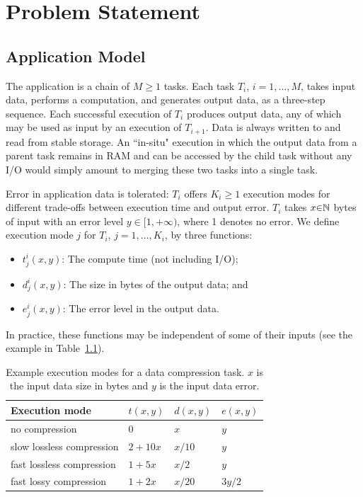 \chapter{Problem Statement}
\label{sec:problem}

\section{Application Model}
\label{sec:problem-application}

The application is a chain of $M{\geq}1$
tasks. Each task $T_i$, $i{=}1, \ldots, M$, takes input data,
performs a computation, and generates output data, as a three-step
sequence. Each successful execution of $T_i$ produces output data,
any of which may be used as input by an execution of $T_{i+1}$. 
Data is always written to and read from stable
storage.  An ``in-situ" execution in which the output data from a parent
task remains in RAM and can be accessed by the child task without
any I/O would simply amount to merging these two
tasks into a single task.


Error in application data is tolerated:  $T_i$ offers $K_i{\geq}1$
execution modes for different trade-offs between
execution time and output error. 
$T_i$ takes $x{\in}\mathbb{N}$ bytes of input with an error level $y{\in}[1,
+\infty)$, where 1 denotes no error.  We define execution mode $j$ for
$T_i$, $j{=}1,\ldots, K_i$, by three functions:
\begin{itemize}
\item $t^i_j(x,y)$: The compute time (not including I/O); 
\item $d^i_j(x,y)$: The size in bytes of the output data; and 
\item $e^i_j(x,y)$: The error level in the output data.  
\end{itemize}
\noindent
In practice, these functions may be independent of some of
their inputs (see the example in Table~\ref{tab:compression_example}).

\begin{table}[hb!]
    \caption{Example execution modes for a data compression task. $x$ is the input data size in bytes
	 and $y$ is the input data error.}
    \label{tab:compression_example}
    \begin{center}
    \begin{tabular}{|l|l|l|l|}
    \hline
    Execution mode & $t(x, y)$ & $d(x,y)$ & $e(x,y)$\\
    \hline
    no compression & $0$ & $x$ & $y$\\
    slow lossless compression & $2{+}10 x$ & $x/10$ & $y$\\
    fast lossless compression & $1{+}5 x$  & $x/2$  & $y$\\
    fast lossy compression    & $1{+}2 x$  & $x/20$ & $3y/2$\\
    \hline
    \end{tabular}
    \end{center}
\end{table}

